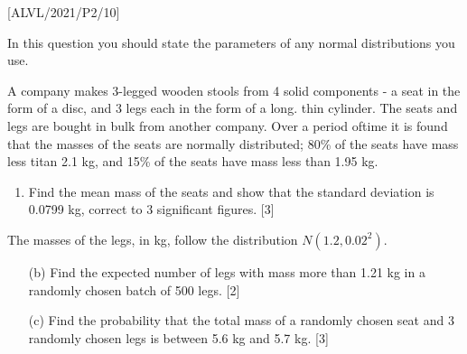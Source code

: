 \item {[}ALVL/2021/P2/10{]}

In this question you should state the parameters of any normal distributions
you use.

A company makes 3-legged wooden stools from 4 solid components - a
seat in the form of a disc, and 3 legs each in the form of a long.
thin cylinder. The seats and legs are bought in bulk from another
company. Over a period oftime it is found that the masses of the seats
are normally distributed; 80\% of the seats have mass less titan 2.1
kg, and 15\% of the seats have mass less than 1.95 kg.
\begin{enumerate}
\item Find the mean mass of the seats and show that the standard deviation
is 0.0799 kg, correct to 3 significant figures. \hfill{}{[}3{]}
\end{enumerate}
The masses of the legs, in kg, follow the distribution $N\left(1.2,0.02^{2}\right)$.
\begin{enumerate}
\item[(b)]  Find the expected number of legs with mass more than 1.21 kg in
a randomly chosen batch of 500 legs. \hfill{}{[}2{]}
\item[(c)]  Find the probability that the total mass of a randomly chosen seat
and 3 randomly chosen legs is between 5.6 kg and 5.7 kg. \hfill{}{[}3{]}
\end{enumerate}
